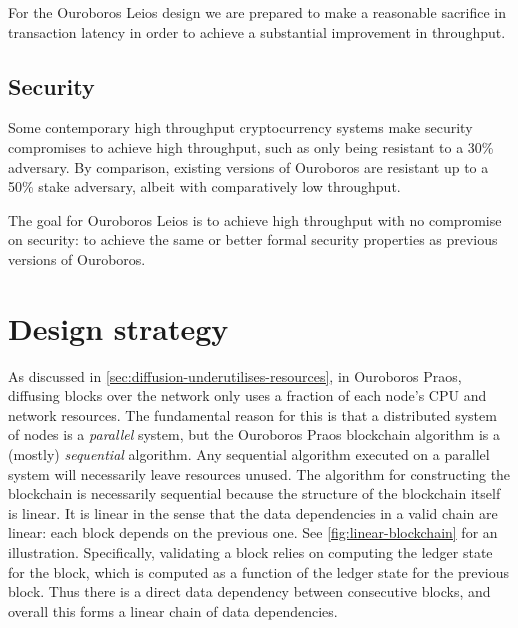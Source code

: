 \documentclass[11pt,a4paper]{article}
\begin{document}
For the Ouroboros Leios design we are prepared to make a reasonable sacrifice
in transaction latency in order to achieve a substantial improvement in
throughput.

\subsection{Security}

Some contemporary high throughput cryptocurrency systems make security
compromises to achieve high throughput, such as only being resistant to a 30\%
adversary. By comparison, existing versions of Ouroboros are resistant up to
a 50\% stake adversary, albeit with comparatively low throughput.

The goal for Ouroboros Leios is to achieve high throughput with no compromise
on security: to achieve the same or better formal security properties as
previous versions of Ouroboros.


\section{Design strategy}
\label{sec:design-strategy}

As discussed in \cref{sec:diffusion-underutilises-resources}, in Ouroboros
Praos, diffusing blocks over the network only uses a fraction of each node's
CPU and network resources. The fundamental reason for this is that a distributed
system of nodes is a \emph{parallel} system, but the Ouroboros Praos blockchain
algorithm is a (mostly) \emph{sequential} algorithm. Any sequential algorithm
executed on a parallel system will necessarily leave resources unused. The
algorithm for constructing the blockchain is necessarily sequential because the
structure of the blockchain itself is linear. It is linear in the sense that
the data dependencies in a valid chain are linear: each block depends on the
previous one. See \cref{fig:linear-blockchain} for an illustration.
Specifically, validating a block relies on computing the ledger state for the
block, which is computed as a function of the ledger state for the previous
block. Thus there is a direct data dependency between consecutive blocks, and
overall this forms a linear chain of data dependencies.
\end{document}
